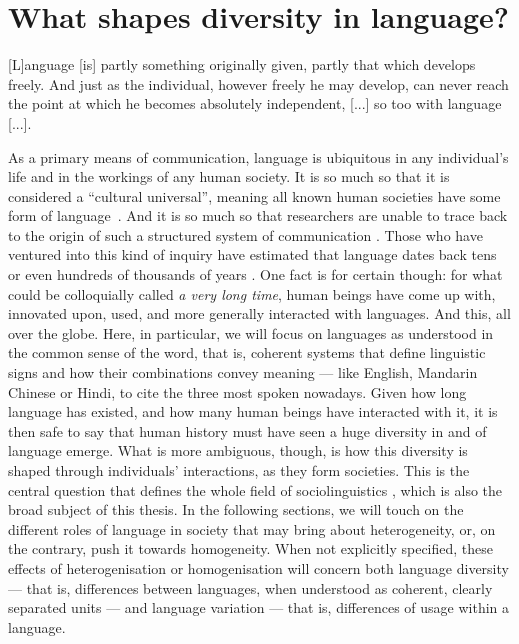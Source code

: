 \documentclass[../thesis.tex]{subfiles}
\begin{document}
\chapter{What shapes diversity in language?} %
\label{ch:origins_lang_diversity}
 
\epigraph{
  [L]anguage [is] partly something originally given, partly that which develops
  freely. And just as the individual, however freely he may develop, can never reach the
  point at which he becomes absolutely independent, [...]
  so too with language [...].
 }{
}

As a primary means of communication, language is ubiquitous in any individual's life and
in the workings of any human society. It is so much so that it is considered a
``cultural universal'', meaning all known human societies have some form of
language~\cite{GreenbergLanguageUniversals2020,BrownDonaldHumanUniversals1991,}. And it
is so much so that researchers are unable to trace back to the origin of such a
structured system of communication
\cite{MullerLectureIX1861,StamInquiriesOrigin1976,GibsonOxfordHandbook2011,HauserMysteryLanguage2014}.
Those who have ventured into this kind of inquiry have estimated that language dates
back tens or even hundreds of thousands of years
\cite{NicholsOriginDispersal1998,ChomskyLanguageMind2004,BothaCradleLanguage2009,DediuAntiquityLanguage2013}.
One fact is for certain though: for what could be colloquially called \emph{a very long
time}, human beings have come up with, innovated upon, used, and more generally
interacted with languages. And this, all over the globe. Here, in particular, we will
focus on languages as understood in the common sense of the word, that is, coherent
systems that define linguistic signs and how their combinations convey meaning --- like
English, Mandarin Chinese or Hindi, to cite the three most spoken nowadays. Given how
long language has existed, and how many human beings have interacted with it, it is then
safe to say that human history must have seen a huge diversity in and of language
emerge. What is more ambiguous, though, is how this diversity is shaped through
individuals' interactions, as they form societies. This is the central question that
defines the whole field of sociolinguistics
\cite{LabovSociolinguisticPatterns1973,TrudgillSociolinguisticsIntroduction2000,ChambersSociolinguisticTheory2007,WardhaughIntroductionSociolinguistics2008,LabovPrinciplesLinguistic2001},
which is also the broad subject of this thesis. In the following sections, we will touch
on the different roles of language in society that may bring about heterogeneity, or, on
the contrary, push it towards homogeneity. When not explicitly specified, these effects
of heterogenisation or homogenisation will concern both language diversity --- that is,
differences between languages, when understood as coherent, clearly separated units --- and
language variation --- that is, differences of usage within a language.
\end{document}
